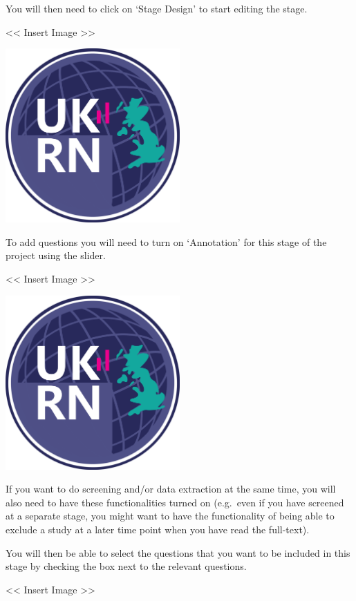 \documentclass[]{book}
\begin{document}
You will then need to click on `Stage Design' to start editing the
stage.

\textless{}\textless{} Insert Image \textgreater{}\textgreater{}

\includegraphics[width=0.50000\textwidth,height=0.50000\textwidth]{figs/evidence-triangle.png}

To add questions you will need to turn on `Annotation' for this stage of
the project using the slider.

\textless{}\textless{} Insert Image \textgreater{}\textgreater{}

\includegraphics[width=0.50000\textwidth,height=0.50000\textwidth]{figs/evidence-triangle.png}

If you want to do screening and/or data extraction at the same time, you
will also need to have these functionalities turned on (e.g.~even if you
have screened at a separate stage, you might want to have the
functionality of being able to exclude a study at a later time point
when you have read the full-text).

You will then be able to select the questions that you want to be
included in this stage by checking the box next to the relevant
questions.

\textless{}\textless{} Insert Image \textgreater{}\textgreater{}
\end{document}
